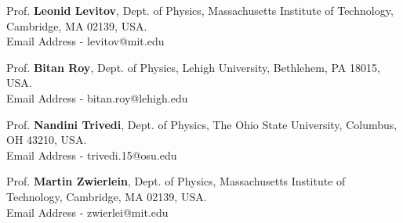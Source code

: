 

\begin{cventries}

\begin{cvitems}

  \item{Prof. \textbf{Leonid Levitov},} %
	{Dept. of Physics, Massachusetts Institute of Technology, Cambridge, MA 02139, USA.} %
	{} %
	{\\}
	{Email Address - levitov@mit.edu} %
  \item{Prof. \textbf{Bitan Roy},} %
	{Dept. of Physics, Lehigh University, Bethlehem, PA 18015, USA.} %
	{} %
	{\\}
	{Email Address - bitan.roy@lehigh.edu} %
  \item{Prof. \textbf{Nandini Trivedi},} %
{Dept. of Physics, The Ohio State University, Columbus, OH 43210, USA.} %
{} %
{\\}
{Email Address - trivedi.15@osu.edu} %
  \item{Prof. \textbf{Martin Zwierlein},} %
{Dept. of Physics, Massachusetts Institute of Technology, Cambridge, MA 02139, USA.} %
{} %
{\\}
{Email Address - zwierlei@mit.edu} %


\end{cvitems}
\end{cventries}
